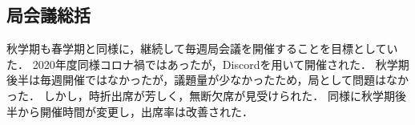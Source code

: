 \subsection*{局会議総括}


秋学期も春学期と同様に，継続して毎週局会議を開催することを目標としていた．
2020年度同様コロナ禍ではあったが，Discordを用いて開催された．
秋学期後半は毎週開催ではなかったが，議題量が少なかったため，局として問題はなかった．
しかし，時折出席が芳しく，無断欠席が見受けられた．
同様に秋学期後半から開催時間が変更し，出席率は改善された．



